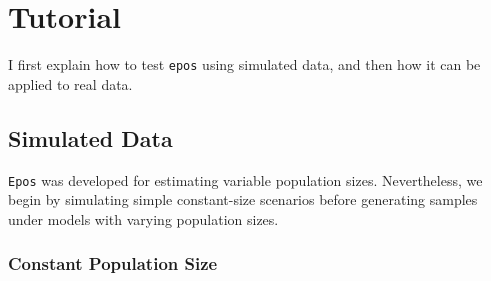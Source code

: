 \documentclass[a4paper]{article}
\newcommand{\ty}{\texttt}
\begin{document}
\section{Tutorial}
I first explain how to test \ty{epos} using simulated
data, and then how it can be applied to real data.
\subsection{Simulated Data}
\ty{Epos} was developed for estimating variable population
sizes. Nevertheless, we begin by simulating simple constant-size
scenarios before generating samples under models with varying population
sizes.
\subsubsection{Constant Population Size}
\end{document}
